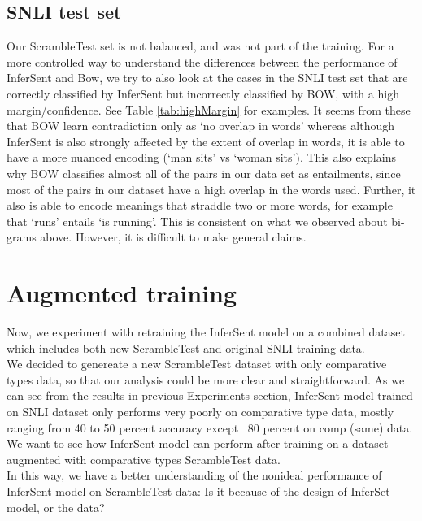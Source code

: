 \documentclass[10pt,letterpaper]{article}
\begin{document}
\subsection{SNLI test set}

Our ScrambleTest set is not balanced, and was not part of the training. For a more controlled way to understand the differences between the performance of InferSent and Bow, we try to also look at the cases in the SNLI test set that are correctly classified by InferSent but incorrectly classified by BOW, with a high margin/confidence. See Table \ref{tab:highMargin} for examples. It seems from these that BOW learn contradiction only as `no overlap in words' whereas although InferSent is also strongly affected by the extent of overlap in words, it is able to have a more nuanced encoding (`man sits' vs `woman sits'). This also explains why BOW classifies almost all of the pairs in our data set as entailments, since most of the pairs in our dataset have a high overlap in the words used. Further, it also is able to encode meanings that straddle two or more words, for example that `runs' entails `is running'. This is consistent on what we observed about bi-grams above. However, it is difficult to make general claims. %

\section{Augmented training}

Now, we experiment with retraining the InferSent model on a combined dataset which includes both new ScrambleTest and original SNLI training data. \\

We decided to genereate a new ScrambleTest dataset with only comparative types data, so that our analysis could be more clear and straightforward. As we can see from the results in previous Experiments section, InferSent model trained on SNLI dataset only performs very poorly on comparative type data, mostly ranging from 40 to 50 percent accuracy except ~80 percent on comp (same) data. We want to see how InferSent model can perform after training on a dataset augmented with comparative types ScrambleTest data. \\

In this way, we have a better understanding of the nonideal performance of InferSent model on ScrambleTest data: Is it because of the design of InferSet model, or the data?
\end{document}
